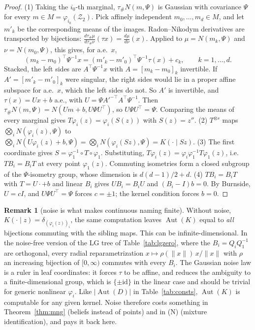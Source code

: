 \documentclass[11pt]{article}
\theoremstyle{definition}
\newtheorem{remark}[theorem]{Remark}
\newcommand{\norm}[1]{\lVert #1\rVert}
\begin{document}
\begin{proof}
(1) Taking the $i_0$-th marginal, $\tau_{\#}N(m,\Psi)$ is Gaussian with covariance $\Psi$ for every
$m\in M=\varphi_{i_0}(\mathcal Z_2)$. Pick affinely independent $m_0,\dots,m_d\in M$, and let
$m'_k$ be the corresponding means of the images. Radon--Nikodym derivatives are transported by
bijections: $\frac{d\tau_\#\mu}{d\tau_\#\nu}(\tau x)=\frac{d\mu}{d\nu}(x)$. Applied to
$\mu=N(m_k,\Psi)$ and $\nu=N(m_0,\Psi)$, this gives, for a.e.\ $x$,
\[
(m_k-m_0)^{\!\top}\Psi^{-1}x=(m'_k-m'_0)^{\!\top}\Psi^{-1}\tau(x)+c_k,\qquad k=1,\dots,d.
\]
Stacked, the left sides are $A^{\!\top}\Psi^{-1}x$ with $A=[m_k-m_0]_k$ invertible. If
$A'=[m'_k-m'_0]_k$ were singular, the right sides would lie in a proper affine subspace for a.e.\
$x$, which the left sides do not. So $A'$ is invertible, and $\tau(x)=Ux+b$ a.e., with
$U=\Psi A'^{-\top}A^{\!\top}\Psi^{-1}$. Then
$\tau_{\#}N(m,\Psi)=N(Um+b,U\Psi U^{\!\top})$, so $U\Psi U^{\!\top}=\Psi$. Comparing the means of every
marginal gives $T\varphi_i(z)=\varphi_i(S(z))$ with $S(z)=z''$.
(2) $T^{\otimes s}$ maps $\bigotimes_iN(\varphi_i(z),\Psi)$ to
$\bigotimes_iN(U\varphi_i(z)+b,\Psi)=\bigotimes_iN(\varphi_i(Sz),\Psi)=K(\cdot\mid Sz)$.
(3) The first coordinate gives $S=\varphi_1^{-1}\circ T\circ\varphi_1$. Substituting,
$T\varphi_i(z)=\varphi_i\varphi_1^{-1}T\varphi_1(z)$, i.e.\ $TB_i=B_iT$ at every point $\varphi_1(z)$.
Commuting isometries form a closed subgroup of the $\Psi$-isometry group, whose dimension is
$d(d-1)/2+d$.
(4) $TB_i=B_iT$ with $T=U\cdot+b$ and linear $B_i$ gives $UB_i=B_iU$ and $(B_i-I)b=0$. By Burnside,
$U=cI$, and $U\Psi U^{\!\top}=\Psi$ forces $c=\pm1$; the kernel condition forces $b=0$.
\end{proof}

\begin{remark}[noise is what makes continuous naming finite]\label{rem:noisehelps}
Without noise, $K(\cdot\mid z)=\delta_{(\varphi_i(z))_i}$, the same computation leaves
$\operatorname{Aut}(K)$ equal to \emph{all} bijections commuting with the sibling maps. This can be
infinite-dimensional. In the noise-free version of the LG tree of Table~\ref{tab:lgzero}, where the
$B_i=Q_iQ_1^{-1}$ are orthogonal, every radial reparametrization $x\mapsto\rho(\norm x)\,x/\norm x$ with
$\rho$ an increasing bijection of $[0,\infty)$ commutes with every $B_i$. The Gaussian noise law is
a ruler in leaf coordinates: it forces $\tau$ to be affine, and reduces the ambiguity to a
finite-dimensional group, which is $\{\pm\mathrm{id}\}$ in the linear case and should be trivial
for generic nonlinear $\varphi_i$. Like $|\operatorname{Aut}(D)|$ in Table~\ref{tab:consts},
$\operatorname{Aut}(K)$ is computable for any given kernel. Noise therefore costs something in
Theorem~\ref{thm:mng} (beliefs instead of points) and in (N) (mixture identification), and pays it
back here.
\end{remark}
\end{document}
